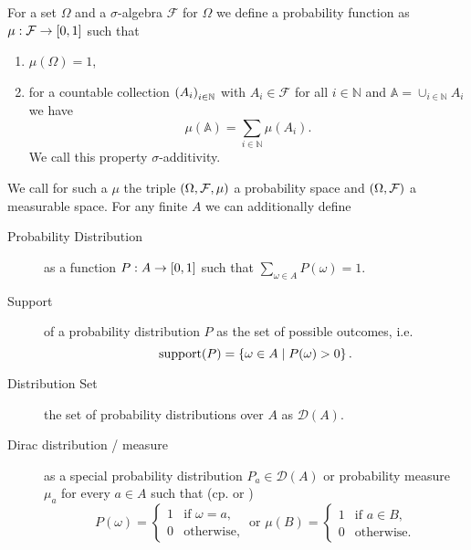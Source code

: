 \begin{definition}
  For a set $\Omega$ and a $\sigma$-algebra $\mathcal{F}$ for $\Omega$ we
  define a probability function as $\mu:\mathcal{F}\rightarrow\left[0,1\right]$
  such that
  \begin{enumerate}
    \item $\mu(\Omega) = 1$,
    \item for a countable collection $\left(A_{i}\right)_{i\in\mathbb{N}}$ with
      $A_{i}\in\mathcal{F}$ for all $i\in\mathbb{N}$ and 
      $\mathbb{A} = \cup_{i\in\mathbb{N}}A_{i}$ we have
      \begin{equation*}
        \mu(\mathbb{A}) = \sum_{i\in\mathbb{N}}\mu(A_{i}).
      \end{equation*}
      We call this property $\sigma$-additivity.
  \end{enumerate}
  We call for such a $\mu$ the triple $\left(\Omega,\mathcal{F},\mu\right)$ a 
  probability space and $\left(\Omega, \mathcal{F}\right)$ a measurable space. For
  any finite $A$ we can additionally define
  \begin{description}
    \item [Probability Distribution] as a function
      $P:A\rightarrow\left[0,1\right]$ such that
      $\sum_{\omega\in A}P(\omega) = 1$.
    \item [Support] of a probability distribution $P$ as the set of possible
      outcomes, i.e.
      \begin{equation*}
        \operatorname{support}(P) = \left\{\omega\in A\mid P(\omega) > 0\right\}.
      \end{equation*}
    \item [Distribution Set] the set of probability distributions over $A$ as
      $\mathcal{D}(A)$.
    \item [Dirac distribution / measure] as a special probability distribution 
      $P_{a}\in\mathcal{D}(A)$ or probability measure $\mu_{a}$ for every 
      $a\in A$ such that (cp. \cite[Example 1.30]{Klenke} or \cite{POSG})
      \begin{equation*}
        P(\omega) = \begin{cases}
          1&\text{if }\omega = a,\\
          0&\text{otherwise},
        \end{cases}
        \text{ or }
        \mu(B) = \begin{cases}
          1&\text{if }a\in B,\\
          0&\text{otherwise}.
        \end{cases}
      \end{equation*}
  \end{description}
\end{definition}
